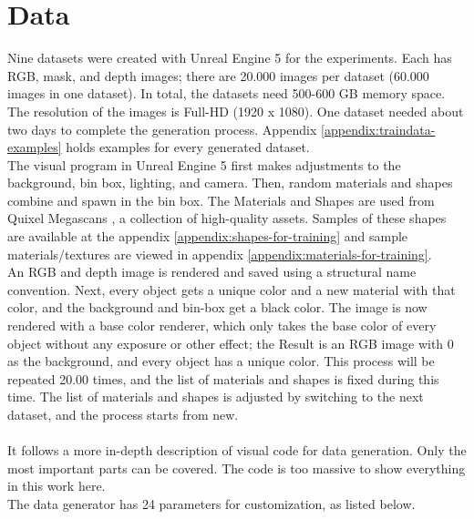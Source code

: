 	\section{Data}
	\label{sec:data}
		Nine datasets were created with Unreal Engine 5 \cite{ue5} for the experiments. Each has RGB, mask, and depth images; there are 20.000 images per dataset (60.000 images in one dataset). In total, the datasets need 500-600 GB memory space. The resolution of the images is Full-HD (1920 x 1080). One dataset needed about two days to complete the generation process. Appendix \ref{appendix:traindata-examples} holds examples for every generated dataset.\\
		The visual program in Unreal Engine 5 first makes adjustments to the background, bin box, lighting, and camera. Then, random materials and shapes combine and spawn in the bin box. The Materials and Shapes are used from Quixel Megascans \cite{Quixel}, a collection of high-quality assets. Samples of these shapes are available at the appendix \ref{appendix:shapes-for-training} and sample materials/textures are viewed in appendix \ref{appendix:materials-for-training}.\\
		An RGB and depth image is rendered and saved using a structural name convention. Next, every object gets a unique color and a new material with that color, and the background and bin-box get a black color. The image is now rendered with a base color renderer, which only takes the base color of every object without any exposure or other effect; the Result is an RGB image with 0 as the background, and every object has a unique color. This process will be repeated 20.00 times, and the list of materials and shapes is fixed during this time. The list of materials and shapes is adjusted by switching to the next dataset, and the process starts from new.\\
		\\
		It follows a more in-depth description of visual code for data generation. Only the most important parts can be covered. The code is too massive to show everything in this work here.\\
		The data generator has 24 parameters for customization, as listed below.
